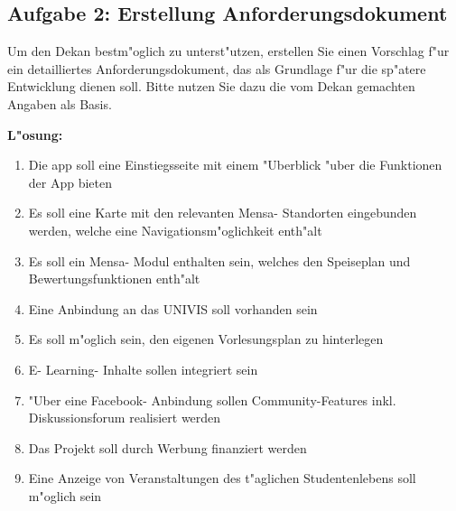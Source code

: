 \subsection{Aufgabe 2: Erstellung Anforderungsdokument}
Um den Dekan bestm"oglich zu unterst"utzen, erstellen Sie einen Vorschlag f"ur ein detailliertes Anforderungsdokument, das als Grundlage f"ur die sp"atere Entwicklung dienen soll. 
Bitte nutzen Sie dazu die vom Dekan gemachten Angaben als Basis.

\textbf{L"osung:}
\begin{enumerate}
    \item Die app soll eine Einstiegsseite mit einem "Uberblick "uber die Funktionen der App bieten 
    \item Es soll eine Karte mit den relevanten Mensa- Standorten eingebunden werden, welche eine Navigationsm"oglichkeit enth"alt 
    \item Es soll ein Mensa- Modul enthalten sein, welches den Speiseplan und Bewertungsfunktionen enth"alt 
    \item Eine Anbindung an das UNIVIS soll vorhanden sein 
    \item Es soll m"oglich sein, den eigenen Vorlesungsplan zu hinterlegen
    \item E- Learning- Inhalte sollen integriert sein 
    \item "Uber eine Facebook- Anbindung sollen Community-Features inkl. Diskussionsforum realisiert werden 
    \item Das Projekt soll durch Werbung finanziert werden 
    \item Eine Anzeige von Veranstaltungen des t"aglichen Studentenlebens soll m"oglich sein
\end{enumerate}


